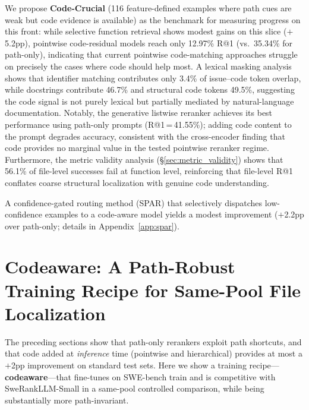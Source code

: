 \documentclass{article}
\begin{document}
We propose \textbf{Code-Crucial} (116 feature-defined examples where path cues are weak but code evidence is available) as the benchmark for measuring progress on this front: while selective function retrieval shows modest gains on this slice ($+$5.2pp), pointwise code-residual models reach only 12.97\% R@1 (vs.\ 35.34\% for path-only), indicating that current pointwise code-matching approaches struggle on precisely the cases where code should help most.
A lexical masking analysis shows that identifier matching contributes only 3.4\% of issue--code token overlap, while docstrings contribute 46.7\% and structural code tokens 49.5\%, suggesting the code signal is not purely lexical but partially mediated by natural-language documentation.
Notably, the generative listwise reranker achieves its best performance using path-only prompts (R@1\,=\,41.55\%); adding code content to the prompt degrades accuracy, consistent with the cross-encoder finding that code provides no marginal value in the tested pointwise reranker regime.
Furthermore, the metric validity analysis (\S\ref{sec:metric_validity}) shows that 56.1\% of file-level successes fail at function level, reinforcing that file-level R@1 conflates coarse structural localization with genuine code understanding.

A confidence-gated routing method (SPAR) that selectively dispatches low-confidence examples to a code-aware model yields a modest improvement ($+$2.2pp over path-only; details in Appendix~\ref{app:spar}).

\section{\textbf{Codeaware}: A Path-Robust Training Recipe for Same-Pool File Localization}
\label{sec:codeaware}

The preceding sections show that path-only rerankers exploit path shortcuts, and that code added at \emph{inference} time (pointwise and hierarchical) provides at most a $+$2pp improvement on standard test sets.
Here we show a training recipe---\textbf{codeaware}---that fine-tunes on SWE-bench train and is competitive with SweRankLLM-Small in a same-pool controlled comparison, while being substantially more path-invariant.
\end{document}
